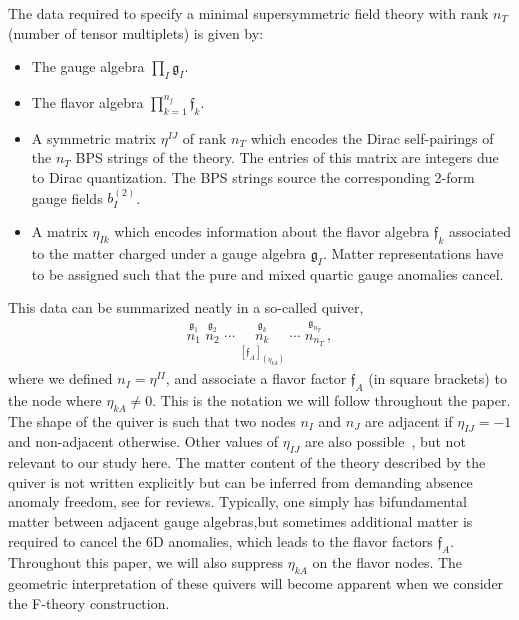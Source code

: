 \documentclass[11pt]{article}
\numberwithin{equation}{section}
\newcommand{\ff}{\mathfrak{f}}
\begin{document}
The data required to specify a minimal supersymmetric field theory with rank $n_{T}$ (number of tensor multiplets) is given by:
\begin{itemize}
    \item The gauge algebra $\prod_{I} \mathfrak{g}_{I}$.
    \item The flavor algebra $\prod_{k=1}^{n_{f}} \mathfrak{f}_{k}$.
    \item A symmetric matrix $\eta^{IJ}$ of rank $n_{T}$ which encodes the Dirac self-pairings of the $n_{T}$ BPS strings of the theory. The entries of this matrix are integers due to Dirac quantization. The BPS strings source the corresponding 2-form gauge fields $b_{I}^{(2)}$. 
    \item A matrix $\eta_{Ik}$ which encodes information about the flavor algebra $\mathfrak{f}_{k}$ associated to the matter charged under a gauge algebra $\mathfrak{g}_{I}$. Matter representations have to be assigned such that the pure and mixed quartic gauge anomalies cancel.
\end{itemize}
This data can be summarized neatly in a so-called quiver,
\begin{align}
\label{eq:quiverF}  
{\overset{\mathfrak{g}_{1}}{n_{1}}}  \, \,     
{\overset{\mathfrak{g}_2}{n_{2}}} \, \,   
\cdots \, \,
\underset{\left[\mathfrak{f}_{A}\right]_{(\eta_{kA})}}
{\overset{\mathfrak{g}_k}{n_{k}}} \, \,
\cdots \, \,
{\overset{\mathfrak{g}_{n_{T}}}{n_{n_{T}}}} \,,
\end{align}
where we defined $n_{I}=\eta^{II}$, and associate a flavor factor $\ff_{A}$ (in square brackets) to the node where $\eta_{kA} \neq 0$. This is the notation we will follow throughout the paper. The shape of the quiver is such that two nodes $n_{I}$ and $n_{J}$ are adjacent if $\eta_{IJ}=-1$ and non-adjacent otherwise. Other values of $\eta_{IJ}$ are also possible~\cite{Bhardwaj:2015oru,Bhardwaj:2018jgp}, but not relevant to our study here. The matter content of the theory described by the quiver is not written explicitly but can be inferred from demanding absence anomaly freedom, see \cite{Weigand:2018rez,Taylor:2011wt,Johnson:2016qar} for reviews. Typically, one simply has bifundamental matter between adjacent gauge algebras,but sometimes additional matter is required to cancel the 6D anomalies, which leads to the flavor factors $\ff_{A}$. Throughout this paper, we will also suppress $\eta_{kA}$ on the flavor nodes. The geometric interpretation of these quivers will become apparent when we consider the F-theory construction.
\end{document}
